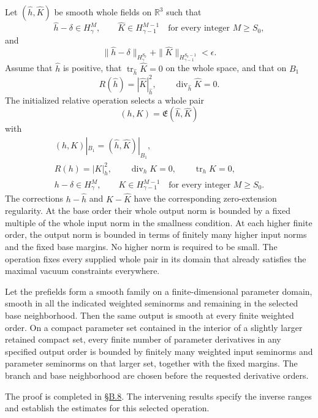 \documentclass[
  english,
  11pt,
  reqno]{amsart}
\begin{document}
Let \((\widehat h,\widehat K)\) be smooth whole fields on
\(\mathbb R^3\) such that \[
\widehat h-\delta\in H^M_\gamma,
\qquad
\widehat K\in H^{M-1}_{\gamma-1}
\quad\text{for every integer }M\ge S_0,
\] and%
 \[
\|\widehat h-\delta\|_{H^{S_0}_\gamma}
+\|\widehat K\|_{H^{S_0-1}_{\gamma-1}}<\epsilon.
\] Assume that \(\widehat h\) is positive, that
\(\operatorname{tr}_{\widehat h}\widehat K=0\) on the whole space, and
that on \(B_1\)%
 \[
R(\widehat h)=|\widehat K|_{\widehat h}^2,
\qquad
\operatorname{div}_{\widehat h}\widehat K=0.
\] The initialized relative operation selects a whole pair \[
(h,K)=\mathfrak E(\widehat h,\widehat K)
\] with%
 \[
\begin{gathered}
(h,K)|_{B_1}=(\widehat h,\widehat K)|_{B_1},\\
R(h)=|K|_h^2,
\qquad \operatorname{div}_hK=0,
\qquad \operatorname{tr}_hK=0,\\
h-\delta\in H^M_\gamma,
\qquad K\in H^{M-1}_{\gamma-1}
\quad\text{for every integer }M\ge S_0.
\end{gathered}
\] The corrections \(h-\widehat h\) and \(K-\widehat K\) have the
corresponding zero-extension regularity. At the base order their whole
output norm is bounded by a fixed multiple of the whole input norm in
the smallness condition. At each higher finite order, the output norm is
bounded in terms of finitely many higher input norms and the fixed base
margins. No higher norm is required to be small. The operation fixes
every supplied whole pair in its domain that already satisfies the
maximal vacuum constraints everywhere.

Let the prefields form a smooth family on a finite-dimensional parameter
domain, smooth in all the indicated weighted seminorms and remaining in
the selected base neighborhood. Then the same output is smooth at every
finite weighted order. On a compact parameter set contained in the
interior of a slightly larger retained compact set, every finite number
of parameter derivatives in any specified output order is bounded by
finitely many weighted input seminorms and parameter seminorms on that
larger set, together with the fixed margins. The branch and base
neighborhood are chosen before the requested derivative orders.

The proof is completed in
\hyperref[sec:online-extension-proof-of-smooth-theorem]{§B.8}. The
intervening results specify the inverse ranges and establish the
estimates for this selected operation.
\end{document}
